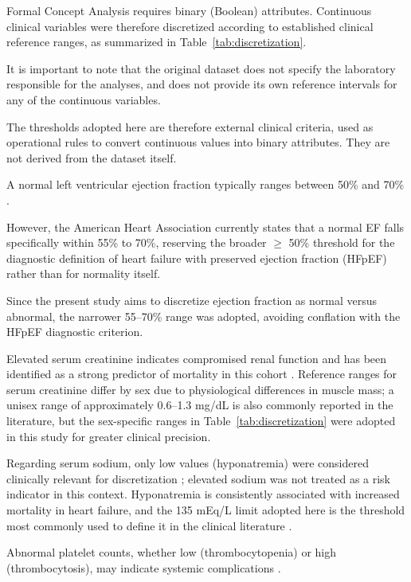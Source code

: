 \documentclass[a4paper,twoside]{article}
\begin{document}
Formal Concept Analysis requires binary (Boolean) attributes. Continuous clinical variables were therefore discretized according to established clinical reference ranges, as summarized in Table~\ref{tab:discretization}.

It is important to note that the original dataset does not specify the laboratory responsible for the analyses, and does not provide its own reference intervals for any of the continuous variables.

The thresholds adopted here are therefore external clinical criteria, used as operational rules to convert continuous values into binary attributes. They are not derived from the dataset itself.

A normal left ventricular ejection fraction typically ranges between 50\% and 70\% \cite{AHA_EF}.

However, the American Heart Association currently states that a normal EF falls specifically within 55\% to 70\%, reserving the broader $\geq$ 50\% threshold for the diagnostic definition of heart failure with preserved ejection fraction (HFpEF) rather than for normality itself.

Since the present study aims to discretize ejection fraction as normal versus abnormal, the narrower 55--70\% range was adopted, avoiding conflation with the HFpEF diagnostic criterion.

Elevated serum creatinine indicates compromised renal function \cite{MedlinePlusCreatinine} and has been identified as a strong predictor of mortality in this cohort \cite{Ahmad2017,ChiccoJurman2020}. Reference ranges for serum creatinine differ by sex due to physiological differences in muscle mass; a unisex range of approximately 0.6--1.3 mg/dL is also commonly reported in the literature, but the sex-specific ranges in Table~\ref{tab:discretization} were adopted in this study for greater clinical precision.

Regarding serum sodium, only low values (hyponatremia) were considered clinically relevant for discretization \cite{MedlinePlusSodium}; elevated sodium was not treated as a risk indicator in this context. Hyponatremia is consistently associated with increased mortality in heart failure, and the 135 mEq/L limit adopted here is the threshold most commonly used to define it in the clinical literature \cite{Zhao2023}.

Abnormal platelet counts, whether low (thrombocytopenia) or high (thrombocytosis), may indicate systemic complications \cite{MedlinePlusPlatelets}.
\end{document}
